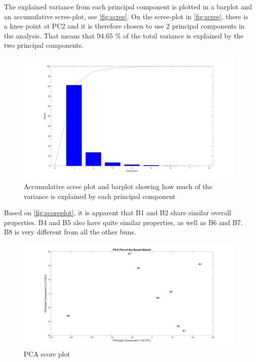 The explained variance from each principal component is plotted in a barplot and an accumulative scree-plot, see \autoref{fig:scree}. On the scree-plot in \autoref{fig:scree}, there is a knee point at PC2 and it is therefore chosen to use 2 principal components in the analysis. That means that 94.65 \% of the total variance is explained by the two principal components.
\begin{figure}[H]
\centering
\includegraphics[width =\textwidth]{Figure/Screeplot}
\caption{Accumulative scree plot and barplot showing how much of the variance is explained by each principal component}
\label{fig:scree}
\end{figure}
\noindent



Based on \autoref{fig:scoreplot}, it is apparent that B1 and B2 share similar overall properties. B4 and B5 also have quite similar properties, as well as B6 and B7. B8 is very different from all the other buns.
\begin{figure}[H]
\centering
\includegraphics[width =\textwidth]{Figure/PCA_plot}
\caption{PCA score plot}
\label{fig:scoreplot}
\end{figure}
\noindent

